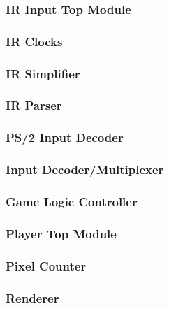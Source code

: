 \documentclass[]{article}
\begin{document}
\subsubsection{IR Input Top Module}

\subsubsection{IR Clocks}

\subsubsection{IR Simplifier}

\subsubsection{IR Parser}

\subsubsection{PS/2 Input Decoder}

\subsubsection{Input Decoder/Multiplexer}

\subsubsection{Game Logic Controller}

\subsubsection{Player Top Module}

\subsubsection{Pixel Counter}

\subsubsection{Renderer}

\end{document}
